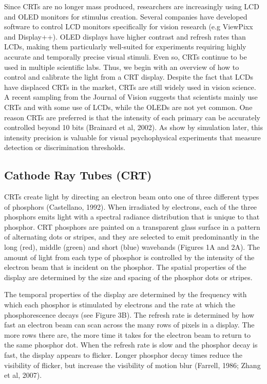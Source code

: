\documentclass[
  letterpaper,
]{book}
\begin{document}
Since CRTs are no longer mass produced, researchers are increasingly
using LCD and OLED monitors for stimulus creation. Several companies
have developed software to control LCD monitors specifically for vision
research (e.g ViewPixx and Display++). OLED displays have higher
contrast and refresh rates than LCDs, making them particularly
well-suited for experiments requiring highly accurate and temporally
precise visual stimuli. Even so, CRTs continue to be used in multiple
scientific labs. Thus, we begin with an overview of how to control and
calibrate the light from a CRT display. Despite the fact that LCDs have
displaced CRTs in the market, CRTs are still widely used in vision
science. A recent sampling from the Journal of Vision suggests that
scientists mainly use CRTs and with some use of LCDs, while the OLEDs
are not yet common. One reason CRTs are preferred is that the intensity
of each primary can be accurately controlled beyond 10 bits (Brainard et
al, 2002). As show by simulation later, this intensity precision is
valuable for visual psychophysical experiments that measure detection or
discrimination thresholds.

\subsection{\texorpdfstring{\textbf{Cathode Ray Tubes
(CRT)}}{Cathode Ray Tubes (CRT)}}\label{cathode-ray-tubes-crt}

CRTs create light by directing an electron beam onto one of three
different types of phosphors (Castellano, 1992). When irradiated by
electrons, each of the three phosphors emits light with a spectral
radiance distribution that is unique to that phosphor. CRT phosphors are
painted on a transparent glass surface in a pattern of alternating dots
or stripes, and they are selected to emit predominantly in the long
(red), middle (green) and short (blue) wavebands (Figures 1A and 2A).
The amount of light from each type of phosphor is controlled by the
intensity of the electron beam that is incident on the phosphor. The
spatial properties of the display are determined by the size and spacing
of the phosphor dots or stripes.

The temporal properties of the display are determined by the frequency
with which each phosphor is stimulated by electrons and the rate at
which the phosphorescence decays (see Figure 3B). The refresh rate is
determined by how fast an electron beam can scan across the many rows of
pixels in a display. The more rows there are, the more time it takes for
the electron beam to return to the same phosphor dot. When the refresh
rate is slow and the phosphor decay is fast, the display appears to
flicker. Longer phosphor decay times reduce the visibility of flicker,
but increase the visibility of motion blur (Farrell, 1986; Zhang et al,
2007).
\end{document}
